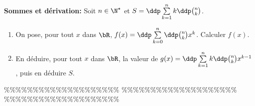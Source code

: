 



\begin{exercice}  \;  \textbf{Sommes et d\'erivation:} 
Soit $n\in\N^{\star}$ et $S=\ddp \sum\limits_{k=1}^n k\ddp \binom{n}{k}$. %
\begin{enumerate}
\item
On pose, pour tout $x$ dans $\bR$, $f(x)=\ddp \sum\limits_{k=0}^n \ddp \binom{n}{k}x^k$. Calculer $f(x)$.
\item 
En d\'eduire, pour tout $x$ dans $\bR$, la valeur de $g(x)=\ddp \sum\limits_{k=1}^n k\ddp \binom{n}{k}x^{k-1}$, puis en d\'eduire $S$.
\end{enumerate}
\end{exercice}


\%\%\%\%\%\%\%\%\%\%\%\%\%\%\%\%\%\%\%\%
\%\%\%\%\%\%\%\%\%\%\%\%\%\%\%\%\%\%\%\%
\%\%\%\%\%\%\%\%\%\%\%\%\%\%\%\%\%\%\%\%




